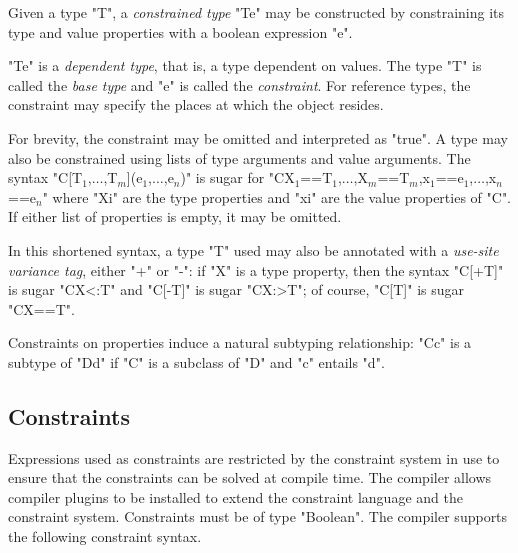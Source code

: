 
        Given a type \xcd"T", a {\em constrained type}
        \xcd"T{e}" may be
        constructed by constraining its type and value properties with a
        boolean expression \xcd"e".

        \xcd"T{e}" is a {\em dependent type}, that is, a type
        dependent on values.
        The type \xcd"T" is called the
        {\em base type} and \xcd"e" is called the {\em constraint}.
        For reference types, the constraint may
        specify the places at which the object resides.

For brevity, the constraint may be omitted and
interpreted as \xcd"true".
A type may also be constrained using lists of type arguments and
value arguments.
The syntax 
\xcdmath"C[T$_1$,$\dots$,T$_m$](e$_1$,$\dots$,e$_n$)" is sugar for
\xcdmath"C{X$_1$==T$_1$,$\dots$,X$_m$==T$_m$,x$_1$==e$_1$,$\dots$,x$_n$==e$_n$}"
where \xcd"Xi" are the type properties and \xcd"xi" are the
value properties of \xcd"C".  
If either list of properties is empty, it may be omitted.

In this shortened syntax, a type \xcd"T" used may also be annotated
with
a \emph{use-site variance tag}, either \xcd"+" or \xcd"-":
if \xcd"X" is a type property, then
the syntax \xcd"C[+T]" is sugar \xcd"C{X<:T}" and
\xcd"C[-T]" is sugar \xcd"C{X:>T}"; of course,
\xcd"C[T]" is sugar \xcd"C{X==T}".

Constraints on properties induce a natural subtyping relationship:
\xcd"C{c}" is a subtype of
\xcd"D{d}" if \xcd"C" is a subclass of \xcd"D" and
\xcd"c" entails \xcd"d".

\subsection{Constraints}

\def\withmath#1{\relax\ifmmode#1\else{$#1$}\fi}
\def\LL#1{\withmath{\lbrack\!\lbrack #1\rbrack\!\rbrack}}

Expressions used as constraints are restricted by the
constraint system in use to ensure that the constraints can
be solved at compile time.  The \Xten{} compiler allows compiler
plugins to be installed to extend the constraint language and
the
constraint system.
Constraints must be of type \xcd"Boolean".
The
compiler supports the following constraint syntax.

